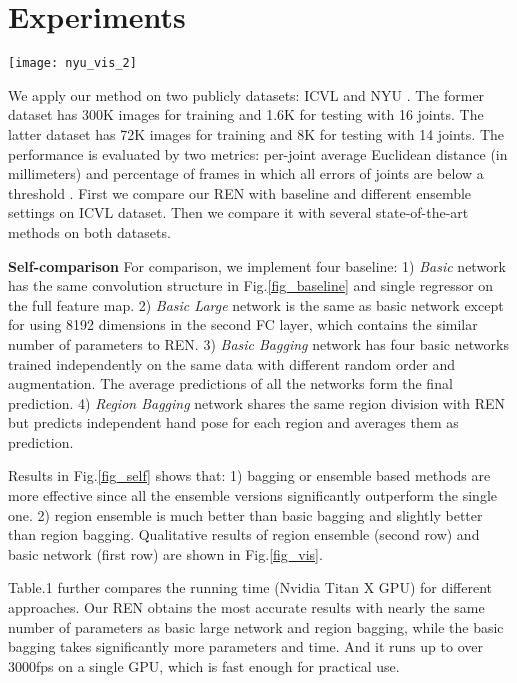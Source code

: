 \documentclass{article}
\begin{document}
\section{Experiments}
\begin{figure*}[htb]
\centering
{\texttt{[image: nyu\_vis\_2]}}
\caption{Example results on ICVL \cite{tang2014latent} and NYU \cite{tompson2014real}: basic network (first row) and region ensemble network (second row).}
\label{fig_vis}
\end{figure*}
We apply our method on two publicly datasets: ICVL \cite{tang2014latent} and NYU \cite{tompson2014real}. The former dataset has 300K images for training and 1.6K for testing with 16 joints. The latter dataset has 72K images for training and 8K for testing with 14 joints. The performance is evaluated by two metrics: per-joint average Euclidean distance (in millimeters) and percentage of frames in which all errors of joints are below a threshold \cite{oberweger2015hands}. First we compare our REN with baseline and different ensemble settings on ICVL dataset. Then we compare it with several state-of-the-art methods on both datasets.

\noindent\textbf{Self-comparison}\hspace{2mm}
For comparison, we implement four baseline: 1) \emph{Basic} network has the same convolution structure in Fig.\ref{fig_baseline} and single regressor on the full feature map. 2) \emph{Basic Large} network is the same as basic network except for using 8192 dimensions in the second FC layer, which contains the similar number of parameters to REN. 3) \emph{Basic Bagging} network has four basic networks trained independently on the same data with different random order and augmentation. The average predictions of all the networks form the final prediction. 4) \emph{Region Bagging} network shares the same region division with REN but predicts independent hand pose for each region and averages them as prediction. 

Results in Fig.\ref{fig_self} shows that: 1) bagging or ensemble based methods are more effective since all the ensemble versions significantly outperform the single one. 2) region ensemble is much better than basic bagging and slightly better than region bagging. Qualitative results of region ensemble (second row) and basic network (first row) are shown in Fig.\ref{fig_vis}. 

Table.1 further compares the running time (Nvidia Titan X GPU) for different approaches. Our REN obtains the most accurate results with nearly the same number of parameters as basic large network and region bagging, while the basic bagging takes significantly more parameters and time. And it runs up to over 3000fps on a single GPU, which is fast enough for practical use.
\end{document}
